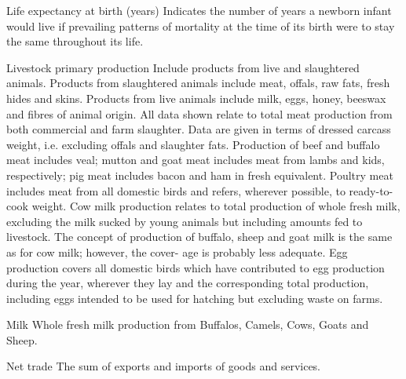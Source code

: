\begin{MetadataCollection} {}
\begin{Energy consumption in agriculture, total} {}
\begin{metadata}{Life expectancy at birth (years)} {}
Indicates the number of years a newborn infant would live if prevailing patterns of mortality at the time of its birth were to stay the same throughout its life.
\end{metadata}

\begin{metadata}{Livestock primary production} {}
Include products from live and slaughtered animals. Products from slaughtered animals include meat, offals, raw fats, fresh hides and skins.  Products from live animals include milk, eggs, honey, beeswax and fibres of animal origin. All data shown relate to total meat production from both commercial and farm slaughter. Data are given in terms of dressed carcass weight, i.e. excluding offals and slaughter fats. Production of beef and buffalo meat includes veal; mutton and goat meat includes meat from lambs and kids, respectively; pig meat includes bacon and ham in fresh equivalent. Poultry meat includes meat from all domestic birds and refers, wherever possible, to ready-to-cook weight. Cow milk production relates to total production of whole fresh milk, excluding the milk sucked by young animals but including amounts fed to livestock. The concept of production of buffalo, sheep and goat milk is the same as for cow milk; however, the cover- age is probably less adequate. Egg production covers all domestic birds which have contributed to egg production during the year, wherever they lay and the corresponding total production, including eggs intended to be used for hatching but excluding waste on farms.
\end{metadata}

\begin{metadata}{Milk} {}
Whole fresh milk production from Buffalos, Camels, Cows, Goats and Sheep.
\end{metadata}

\begin{metadata}{Net trade} {}
The sum of exports and imports of goods and services.
\end{metadata}


\end{Energy consumption in agriculture, total}
\end{MetadataCollection}

